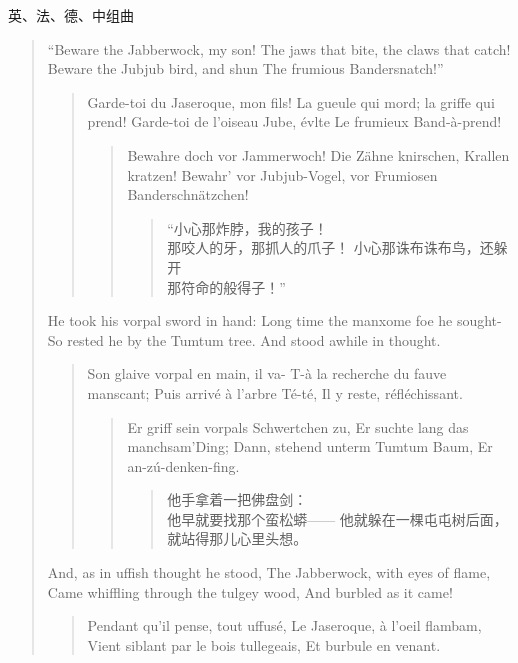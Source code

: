 \begin{dialog}{英、法、德、中组曲}
\begin{verse}
``Beware the Jabberwock, my son!
The jaws that bite, the claws that catch!
Beware the Jubjub bird, and shun
The frumious Bandersnatch!''

  \begin{verse}
  \guillemotleft Garde-toi du Jaseroque, mon fils!
  La gueule qui mord; la griffe qui prend!
  Garde-toi de l'oiseau Jube, évlte
  Le frumieux Band-à-prend!\guillemotright

    \begin{verse}
    \guillemotright Bewahre doch vor Jammerwoch!
    Die Zähne knirschen, Krallen kratzen!
    Bewahr' vor Jubjub-Vogel, vor
    Frumiosen Banderschnätzchen!\guillemotleft

      \begin{verse}
      “小心那炸脖，我的孩子！\\
      那咬人的牙，那抓人的爪子！
      小心那诛布诛布鸟，还躲开\\
      那符命的般得子！”
      \end{verse}
    \end{verse}
  \end{verse}

He took his vorpal sword in hand:
Long time the manxome foe he sought-
So rested he by the Tumtum tree.
And stood awhile in thought.

  \begin{verse}
  Son glaive vorpal en main, il va-
  T-à la recherche du fauve manscant;
  Puis arrivé à l'arbre Té-té,
  Il y reste, réfléchissant.

    \begin{verse}
    Er griff sein vorpals Schwertchen zu,
    Er suchte lang das manchsam'Ding;
    Dann, stehend unterm Tumtum Baum,
    Er an-zú-denken-fing.

      \begin{verse}
      他手拿着一把佛盘剑：\\
      他早就要找那个蛮松蟒——
      他就躲在一棵屯屯树后面，\\
      就站得那儿心里头想。
      \end{verse}
    \end{verse}
  \end{verse}

And, as in uffish thought he stood,
The Jabberwock, with eyes of flame,
Came whiffling through the tulgey wood,
And burbled as it came!

  \begin{verse}
  Pendant qu'il pense, tout uffusé,
  Le Jaseroque, à l'oeil flambam,
  Vient siblant par le bois tullegeais,
  Et burbule en venant.


\end{verse}
\end{verse}
\end{dialog}
